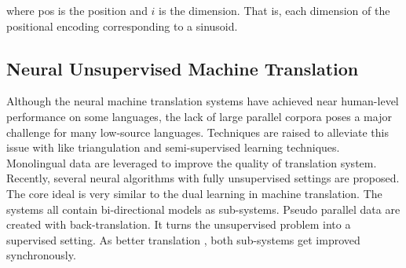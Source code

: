 where pos is the position and $i$ is the dimension. That is, each dimension of the positional encoding corresponding to a sinusoid.






\subsection{Neural Unsupervised Machine Translation}
 Although the neural machine translation systems have achieved near human-level performance on some languages, the lack of large parallel corpora poses a major challenge for many low-source languages.
 Techniques are raised to alleviate this issue with like triangulation and semi-supervised learning techniques.  Monolingual data are leveraged to improve the quality of translation system. \\
 Recently, several neural algorithms with fully unsupervised settings are proposed. The core ideal is very similar to the dual learning in machine translation. The systems all contain bi-directional models as sub-systems. Pseudo parallel data are created with back-translation. It turns the unsupervised problem into a supervised setting. As better translation , both sub-systems get improved synchronously.\\
 









